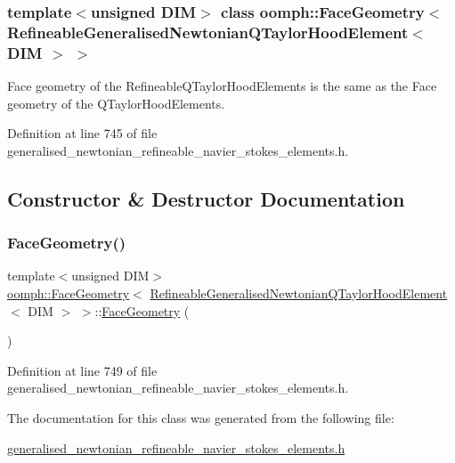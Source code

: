 \subsubsection*{template$<$unsigned D\+IM$>$\newline
class oomph\+::\+Face\+Geometry$<$ Refineable\+Generalised\+Newtonian\+Q\+Taylor\+Hood\+Element$<$ D\+I\+M $>$ $>$}

Face geometry of the Refineable\+Q\+Taylor\+Hood\+Elements is the same as the Face geometry of the Q\+Taylor\+Hood\+Elements. 

Definition at line 745 of file generalised\+\_\+newtonian\+\_\+refineable\+\_\+navier\+\_\+stokes\+\_\+elements.\+h.



\subsection{Constructor \& Destructor Documentation}
\mbox{\label{classoomph_1_1FaceGeometry_3_01RefineableGeneralisedNewtonianQTaylorHoodElement_3_01DIM_01_4_01_4_a192cea887d1dd7b1740e1a37ee3406b7}} 
\subsubsection{\texorpdfstring{Face\+Geometry()}{FaceGeometry()}}
{\footnotesize\ttfamily template$<$unsigned D\+IM$>$ \\
\hyperlink{classoomph_1_1FaceGeometry}{oomph\+::\+Face\+Geometry}$<$ \hyperlink{classoomph_1_1RefineableGeneralisedNewtonianQTaylorHoodElement}{Refineable\+Generalised\+Newtonian\+Q\+Taylor\+Hood\+Element}$<$ D\+IM $>$ $>$\+::\hyperlink{classoomph_1_1FaceGeometry}{Face\+Geometry} (\begin{DoxyParamCaption}{ }\end{DoxyParamCaption})\hspace{0.3cm}{\ttfamily [inline]}}



Definition at line 749 of file generalised\+\_\+newtonian\+\_\+refineable\+\_\+navier\+\_\+stokes\+\_\+elements.\+h.



The documentation for this class was generated from the following file\+:\begin{DoxyCompactItemize}
\item 
\hyperlink{generalised__newtonian__refineable__navier__stokes__elements_8h}{generalised\+\_\+newtonian\+\_\+refineable\+\_\+navier\+\_\+stokes\+\_\+elements.\+h}\end{DoxyCompactItemize}
